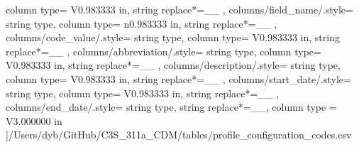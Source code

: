 \begin{landscape}
{            column type= V{0.983333 in}, 
            string replace*={_}{\_}
        },
    columns/field_name/.style={
            string type, 
            column type= n{0.983333 in}, 
            string replace*={_}{\_}
        },
    columns/code_value/.style={
            string type, 
            column type= V{0.983333 in}, 
            string replace*={_}{\_}
        },
    columns/abbreviation/.style={
            string type, 
            column type= V{0.983333 in}, 
            string replace*={_}{\_}
        },
    columns/description/.style={
            string type, 
            column type= V{0.983333 in}, 
            string replace*={_}{\_}
        },
    columns/start_date/.style={
            string type, 
            column type= V{0.983333 in}, 
            string replace*={_}{\_}
        },
    columns/end_date/.style={
            string type, 
            string replace*={_}{\_},
            column type = V{3.000000 in}
        }
    ]{/Users/dyb/GitHub/C3S_311a_CDM/tables/profile_configuration_codes.csv}
\end{landscape}
